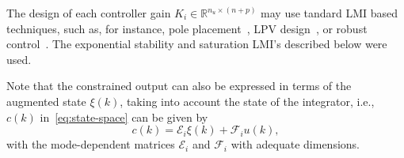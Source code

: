 The design of each controller gain \(K_i\in\mathbb{R}^{n_u\times{}(n+p)}\) may use
tandard LMI based techniques, such as, for instance, pole
placement~\parencite{yu:lmis}, LPV design~\parencite{briat:linear}, or robust
control~\parencite{boyd.ghaoui.ea:linear}. The exponential stability and
saturation LMI's described below were used.

Note that the constrained output can also be expressed in terms of the augmented
state \(\xi(k)\), taking into account the state of the integrator, i.e., \(c(k)\)
in~\eqref{eq:state-space} can be given by
%
\begin{equation}
  \label{eq:constrained-output}
  c(k) = \mathcal{E}_i\xi(k) + \mathcal{F}_i u(k),
\end{equation}
%
with the mode-dependent matrices \(\mathcal{E}_i\) and \(\mathcal{F}_i\) with
adequate dimensions.

